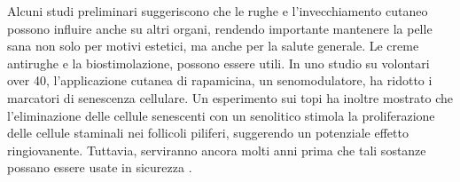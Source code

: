 \documentclass[12pt]{book} %
\begin{document}
\begin{mdframed}[linewidth=1pt]
Alcuni studi preliminari suggeriscono che le rughe e l’invecchiamento cutaneo possono influire anche su altri organi, rendendo importante mantenere la pelle sana non solo per motivi estetici, ma anche per la salute generale. Le creme antirughe e la biostimolazione, possono essere utili. In uno studio su volontari over 40, l’applicazione cutanea di rapamicina, un senomodulatore, ha ridotto i marcatori di senescenza cellulare. Un esperimento sui topi ha inoltre mostrato che l’eliminazione delle cellule senescenti con un senolitico stimola la proliferazione delle cellule staminali nei follicoli piliferi, suggerendo un potenziale effetto ringiovanente. Tuttavia, serviranno ancora molti anni prima che tali sostanze possano essere usate in sicurezza   .
\end{mdframed}
\end{document}

